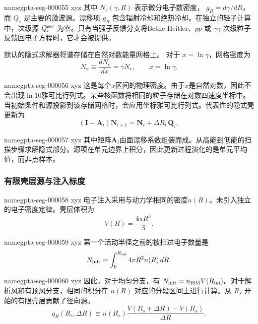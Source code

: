 \documentclass[twocolumn]{aastex702}
\makeatletter
\providecommand{\gptareaderanchor}[1]{\pdfdest name{#1} xyz}%
\providecommand{\gptareaderanchor}[1]{\special{pdf:dest (#1) [ @thispage /XYZ @xpos @ypos null ]}}%
\makeatother
\begin{document}
\gptareaderanchor{gpta-seg-000055}%
其中 \(N_e(\gamma,R)\) 表示微分电子数密度，
\(g_R=d\gamma/dR\)，而 \(Q_e\) 是主要的激波源。漂移项 \(g_R\)
包含辐射冷却和绝热冷却。在独立的轻子计算中，次级源
\(Q_e^{\rm sec}\) 为零。只有当强子反馈分支将Bethe-Heitler、\(pp\) 或
\(\gamma\gamma\) 次级粒子反馈回电子方程时，它才会被提供。

默认的隐式求解器将谱存储在自然对数能量网格上。
对于 \(x=\ln\gamma\)，网格密度为
\begin{equation}
N_x\equiv\frac{dN_e}{dx}=\gamma N_e,
\qquad x=\ln\gamma .
\end{equation}

\gptareaderanchor{gpta-seg-000056}%
这是每个\(x\)区间的物理密度。由于\(x\)是自然对数，因此不会出现\(\ln 10\)雅可比行列式。某些核函数将相同的粒子存储在对数四速度坐标中。当初始条件和源投影到该存储网格时，会应用坐标雅可比行列式。代表性的隐式壳更新为
\begin{equation}
\left(\mathbf{I}-\mathbf{A}_i\right)\mathbf{N}_{i+1}
=\mathbf{N}_{i}+\Delta R_i\,\mathbf{Q}_{i},
\end{equation}

\gptareaderanchor{gpta-seg-000057}%
其中矩阵\(\mathbf{A}_i\)由面漂移系数组装而成。从高能到低能的扫描步骤求解隐式部分。源项在单元边界上积分，因此更新过程演化的是单元平均值，而非点样本。

\subsubsection{有限壳层源与注入标度}


\gptareaderanchor{gpta-seg-000058}%
电子注入采用与动力学相同的密度\(n(R)\)。未引入独立的电子密度定律。壳层体积为
\begin{equation}
V(R)=\frac{4\pi R^3}{3}.
\end{equation}

\gptareaderanchor{gpta-seg-000059}%
第一个活动半径之前的被扫过电子数量是
\begin{equation}
N_{\rm init}=\int_0^{R_{\rm ini}}4\pi R^2 n(R)\,dR .
\end{equation}

\gptareaderanchor{gpta-seg-000060}%
因此，对于均匀分支，有 \(N_{\rm init}=n_{\rm ISM}V(R_{\rm ini})\)。对于解析风和有顶风分支，相同的积分在 \(n(R)\) 对应的分段区间上进行计算。从 \(R_s\) 开始的有限壳层贡献了径向源。
\begin{equation}
q_R(R_s,\Delta R)
\equiv
n(R_s)\frac{V(R_s+\Delta R)-V(R_s)}{\Delta R}.
\end{equation}
\end{document}
